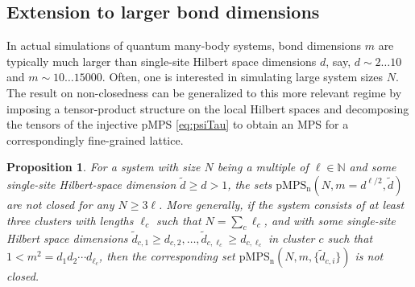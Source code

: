\documentclass[english,11pt,aps,pra,onecolumn,tightenlines,groupedaddress,superscriptaddress,notitlepage,floatfix,fleqn]{revtex4-1}
\newcommand{\NN}{\mathbb{N}}
\newcommand{\pMPSn}{\operatorname{pMPS_n}}
\newtheorem{prop}{Proposition}
\begin{document}
\subsection{Extension to larger bond dimensions}\label{sec:pMPSlarge}
In actual simulations of quantum many-body systems, bond dimensions $m$ are typically much larger than single-site Hilbert space dimensions $d$, say, $d\sim 2\dots 10$ and $m\sim 10\dots 15000$. Often, one is interested in simulating large system sizes $N$.
The result on non-closedness can be generalized to this more relevant regime by imposing a tensor-product structure on the local Hilbert spaces and decomposing the tensors of the injective pMPS \eqref{eq:psiTau} to obtain an MPS for a correspondingly fine-grained lattice.
\begin{prop}\label{prop:pMPSbig}
For a system with size $N$ being a multiple of $\ell\in\NN$ and some single-site Hilbert-space dimension $\tilde{d}\geq d > 1$, the sets $\pMPSn(N,m=d^{\ell/2},\tilde{d})$ are not closed for any $N\geq 3\ell$.
More generally, if the system consists of at least three clusters with lengths $\ell_c$ such that $N=\sum_c\ell_c$, and with some single-site Hilbert space dimensions $\tilde{d}_{c,1}\geq d_{c,2},\dotsc,\tilde{d}_{c,\ell_c}\geq d_{c,\ell_c}$ in cluster $c$ such that $1<m^2=d_1 d_2 \dotsb d_{\ell_c}$, then the corresponding set $\pMPSn(N,m,\{\tilde{d}_{c,i}\})$ is not closed.
\end{prop}
\end{document}
